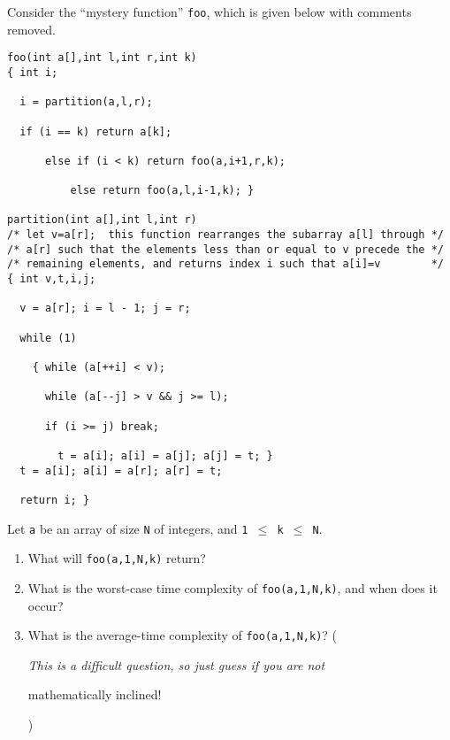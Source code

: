 Consider the ``mystery function'' {\tt foo}, which is given below with
comments removed.

\begin{verbatim}
foo(int a[],int l,int r,int k)
{ int i;

  i = partition(a,l,r);

  if (i == k) return a[k];

      else if (i < k) return foo(a,i+1,r,k);

          else return foo(a,l,i-1,k); }

partition(int a[],int l,int r)
/* let v=a[r];  this function rearranges the subarray a[l] through */
/* a[r] such that the elements less than or equal to v precede the */
/* remaining elements, and returns index i such that a[i]=v        */
{ int v,t,i,j;

  v = a[r]; i = l - 1; j = r;

  while (1)

    { while (a[++i] < v);

      while (a[--j] > v && j >= l);

      if (i >= j) break;

        t = a[i]; a[i] = a[j]; a[j] = t; }
  t = a[i]; a[i] = a[r]; a[r] = t;

  return i; }
\end{verbatim}

Let {\tt a} be an array of size {\tt N} of integers, and {\tt 1 $\leq$ k $\leq$ N}.

\begin{enumerate}

\item  What will {\tt foo(a,1,N,k)} return?

\item  What is the worst-case time complexity of {\tt foo(a,1,N,k)}, and
when does it occur?

\item  What is the average-time complexity of {\tt foo(a,1,N,k)}?
({\em This is a difficult question, so just guess if you are not

mathematically inclined!})

\end{enumerate}
